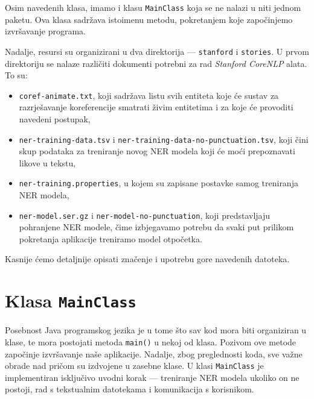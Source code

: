 \documentclass[a4paper,twoside,12pt]{memoir} %
\newcommand{\ti}[1]{\textit{#1\/}}
\begin{document}
		Osim navedenih klasa, imamo i klasu \texttt{MainClass} koja se ne nalazi u niti jednom paketu. Ova klasa sadržava istoimenu metodu, pokretanjem koje započinjemo izvršavanje programa.

		\bigskip

		Nadalje, resursi su organizirani u dva direktorija --- \texttt{stanford} i \texttt{stories}. U prvom direktoriju se nalaze različiti dokumenti potrebni za rad \ti{Stanford CoreNLP} alata. To su:

		\begin{itemize}
			\item 	\texttt{coref-animate.txt}, koji sadržava listu svih entiteta koje će sustav za razrješavanje koreferencije smatrati živim entitetima i za koje će provoditi navedeni postupak,

			\item	\texttt{ner-training-data.tsv} i \texttt{ner-training-data-no-punctuation.tsv}, koji čini skup podataka za treniranje novog NER modela koji će moći prepoznavati likove u tekstu,

			\item 	\texttt{ner-training.properties}, u kojem su zapisane postavke samog treniranja NER modela,

			\item 	\texttt{ner-model.ser.gz} i \texttt{ner-model-no-punctuation}, koji predstavljaju pohranjene NER modele, čime izbjegavamo potrebu da svaki put prilikom pokretanja aplikacije treniramo model otpočetka.
		\end{itemize}

		Kasnije ćemo detaljnije opisati značenje i upotrebu gore navedenih datoteka.


	\section{Klasa \texttt{MainClass}}

		Posebnost Java programskog jezika je u tome što sav kod mora biti organiziran u klase, te mora postojati metoda \texttt{main()} u nekoj od klasa. Pozivom ove metode započinje izvršavanje naše aplikacije. Nadalje, zbog preglednosti koda, sve važne obrade nad pričom su izdvojene u zasebne klase. U klasi \texttt{MainClass} je implementiran isključivo uvodni korak --- treniranje NER modela ukoliko on ne postoji, rad s tekstualnim datotekama i komunikacija s korisnikom.
\end{document}
